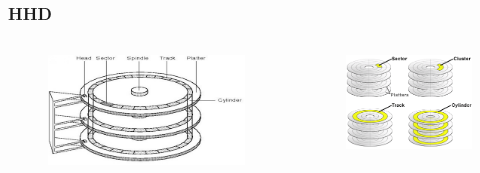 \begin{frame}
	\frametitle{HHD}
	 

	\begin{columns}			
		\begin{figure}[!htbp]
			\centering 
			\includegraphics[width=1.0\linewidth]{images/5_memory/hdd_info_2.png}
		\end{figure}

		\begin{figure}[!htbp]
			\centering 
			\includegraphics[width=1.0\linewidth]{images/5_memory/hdd_info_3.png}
		\end{figure}
	\end{columns}
	
\end{frame}



